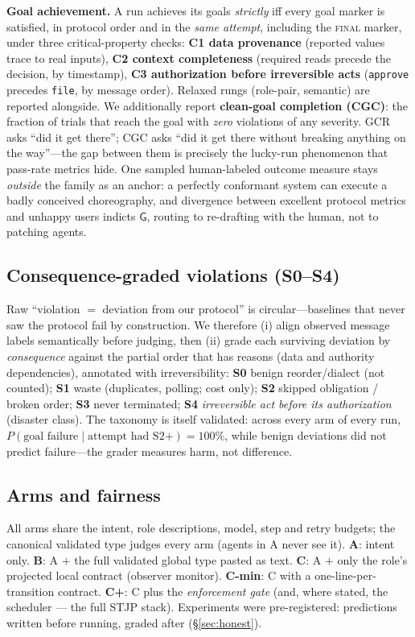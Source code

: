 \documentclass{article}
\newcommand{\gtG}{\mathsf{G}}
\newcommand{\stjp}{\textsc{STJP}}
\begin{document}
\textbf{Goal achievement.} A run achieves its goals \emph{strictly} iff every goal marker is satisfied, in protocol order and in the \emph{same attempt}, including the \textsc{final} marker, under three critical-property checks: \textbf{C1 data provenance} (reported values trace to real inputs), \textbf{C2 context completeness} (required reads precede the decision, by timestamp), \textbf{C3 authorization before irreversible acts} (\texttt{approve} precedes \texttt{file}, by message order). Relaxed rungs (role-pair, semantic) are reported alongside. We additionally report \textbf{clean-goal completion (CGC)}: the fraction of trials that reach the goal with \emph{zero} violations of any severity. GCR asks ``did it get there''; CGC asks ``did it get there without breaking anything on the way''---the gap between them is precisely the lucky-run phenomenon that pass-rate metrics hide. One sampled human-labeled outcome measure stays \emph{outside} the family as an anchor: a perfectly conformant system can execute a badly conceived choreography, and divergence between excellent protocol metrics and unhappy users indicts $\gtG$, routing to re-drafting with the human, not to patching agents.

\subsection{Consequence-graded violations (S0--S4)}
Raw ``violation $=$ deviation from our protocol'' is circular---baselines that never saw the protocol fail by construction. We therefore (i) align observed message labels semantically before judging, then (ii) grade each surviving deviation by \emph{consequence} against the partial order that has reasons (data and authority dependencies), annotated with irreversibility: \textbf{S0} benign reorder/dialect (not counted); \textbf{S1} waste (duplicates, polling; cost only); \textbf{S2} skipped obligation / broken order; \textbf{S3} never terminated; \textbf{S4} \emph{irreversible act before its authorization} (disaster class). The taxonomy is itself validated: across every arm of every run, $P(\text{goal failure}\mid\text{attempt had S2+})=100\%$, while benign deviations did not predict failure---the grader measures harm, not difference.

\subsection{Arms and fairness}
All arms share the intent, role descriptions, model, step and retry budgets; the canonical validated type judges every arm (agents in A never see it). \textbf{A}: intent only. \textbf{B}: A $+$ the full validated global type pasted as text. \textbf{C}: A $+$ only the role's projected local contract (observer monitor). \textbf{C-min}: C with a one-line-per-transition contract. \textbf{C+}: C plus the \emph{enforcement gate} (and, where stated, the scheduler --- the full \stjp{} stack). Experiments were pre-registered: predictions written before running, graded after (\S\ref{sec:honest}).
\end{document}
